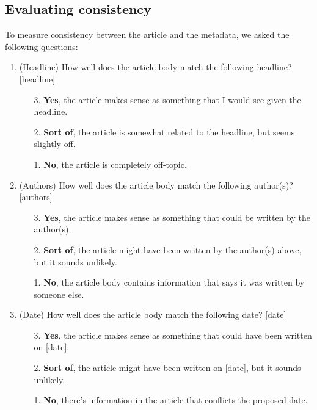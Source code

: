 \documentclass{article}
\begin{document}
\subsection{Evaluating consistency}
To measure consistency between the article and the metadata, we asked the following questions:
\begin{enumerate}[label=(\alph*)]
    \item (Headline) How well does the article body match the following headline? [headline]
        \begin{enumerate}
        \item[3.]  \textbf{Yes}, the article makes sense as something that I would see given the headline.
        \item[2.]  \textbf{Sort of}, the article is somewhat related to the headline, but seems slightly off.
        \item[1.]  \textbf{No}, the article is completely off-topic.
    \end{enumerate}
    \item (Authors) How well does the article body match the following author(s)? [authors]
        \begin{enumerate}
        \item[3.]  \textbf{Yes}, the article makes sense as something that could be written by the author(s).
        \item[2.]  \textbf{Sort of}, the article might have been written by the author(s) above, but it sounds unlikely.
        \item[1.]  \textbf{No}, the article body contains information that says it was written by someone else.
    \end{enumerate}
    \item (Date) How well does the article body match the following date? [date]
        \begin{enumerate}
        \item[3.]  \textbf{Yes}, the article makes sense as something that could have been written on [date].
        \item[2.]  \textbf{Sort of}, the article might have been written on [date], but it sounds unlikely.
        \item[1.]  \textbf{No}, there's information in the article that conflicts the proposed date.
    \end{enumerate}
\end{enumerate}
\end{document}
